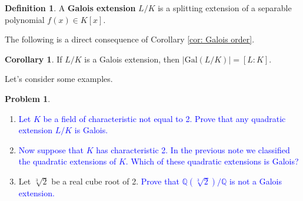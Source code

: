 \documentclass[11pt]{article}
\def\QQ{\mathbb{Q}}
\def\gal{\mathrm{Gal}}
\theoremstyle{definition}
\newtheorem{corollary}[theorem]{Corollary}
\newtheorem{definition}[theorem]{Definition}
\newtheorem{problem}{Problem}[section]
\numberwithin{equation}{subsection}
\newcommand{\blue}[1]{\textcolor{blue}{#1}}
\begin{document}
\begin{definition}
    A \textbf{Galois extension} $L/K$ is a splitting extension of a separable polynomial $f(x) \in K[x]$.
\end{definition}

The following is a direct consequence of Corollary \ref{cor: Galois order}.

\begin{corollary}
    If $L/K$ is a Galois extension, then $|\gal(L/K)| = [L : K]$.
\end{corollary}

Let's consider some examples.

\begin{problem}\,
    \begin{enumerate}
        \item \blue{Let $K$ be a field of characteristic not equal to 2.
        Prove that any quadratic extension $L/K$ is Galois.}

        \item \blue{Now suppose that $K$ has characteristic 2.
        In the previous note we classified the quadratic extensions of $K$.
        Which of these quadratic extensions is Galois?}

        \item Let $\sqrt[3]{2}$ be a real cube root of 2.
        \blue{Prove that $\QQ(\sqrt[3]{2})/\QQ$ is not a Galois extension.}
    \end{enumerate}
\end{problem}
\end{document}
